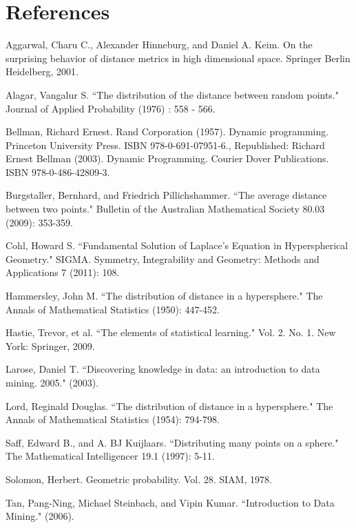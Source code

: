 \documentclass[11pt]{article} %
\begin{document}
\section{References}

\noindent [1] Aggarwal, Charu C., Alexander Hinneburg, and Daniel A. Keim. On the surprising behavior of distance metrics in high dimensional space. Springer Berlin Heidelberg, 2001.

\noindent [2] Alagar, Vangalur S. ``The distribution of the distance between random points." Journal of Applied Probability (1976) : 558 - 566.

\noindent [3] Bellman, Richard Ernest. Rand Corporation (1957). Dynamic programming. Princeton University Press. ISBN 978-0-691-07951-6.,
Republished: Richard Ernest Bellman (2003). Dynamic Programming. Courier Dover Publications. ISBN 978-0-486-42809-3.

\noindent [4] Burgstaller, Bernhard, and Friedrich Pillichshammer. ``The average distance between two points." Bulletin of the Australian Mathematical Society 80.03 (2009): 353-359.

\noindent [5] Cohl, Howard S. ``Fundamental Solution of Laplace's Equation in Hyperspherical Geometry." SIGMA. Symmetry, Integrability and Geometry: Methods and Applications 7 (2011): 108.

\noindent [6] Hammersley, John M. ``The distribution of distance in a hypersphere." The Annals of Mathematical Statistics (1950): 447-452.

\noindent [7] Hastie, Trevor, et al. ``The elements of statistical learning." Vol. 2. No. 1. New York: Springer, 2009.

\noindent [8] Larose, Daniel T. ``Discovering knowledge in data: an introduction to data mining. 2005." (2003).

\noindent [9] Lord, Reginald Douglas. ``The distribution of distance in a hypersphere." The Annals of Mathematical Statistics (1954): 794-798.

\noindent [10] Saff, Edward B., and A. BJ Kuijlaars. ``Distributing many points on a sphere." The Mathematical Intelligencer 19.1 (1997): 5-11.

\noindent [11] Solomon, Herbert. Geometric probability. Vol. 28. SIAM, 1978.

\noindent [12] Tan, Pang-Ning, Michael Steinbach, and Vipin Kumar. ``Introduction to Data Mining." (2006).
\end{document}
